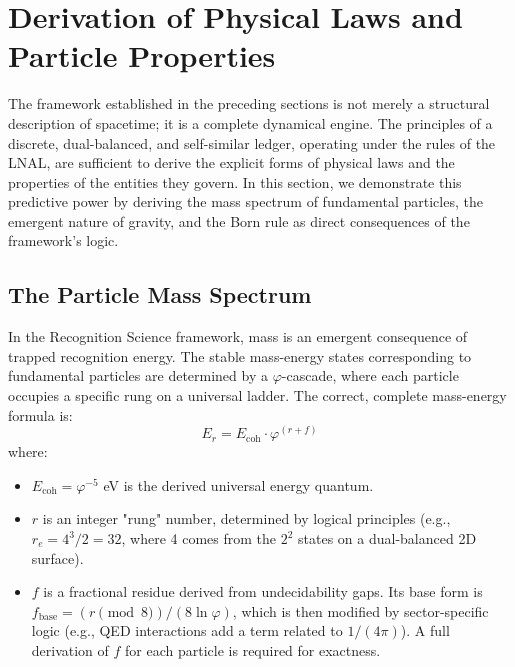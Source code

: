 \documentclass[11pt,a4paper]{article}
\begin{document}
\section{Derivation of Physical Laws and Particle Properties}

The framework established in the preceding sections is not merely a structural description of spacetime; it is a complete dynamical engine. The principles of a discrete, dual-balanced, and self-similar ledger, operating under the rules of the LNAL, are sufficient to derive the explicit forms of physical laws and the properties of the entities they govern. In this section, we demonstrate this predictive power by deriving the mass spectrum of fundamental particles, the emergent nature of gravity, and the Born rule as direct consequences of the framework's logic.

\subsection{The Particle Mass Spectrum}
In the Recognition Science framework, mass is an emergent consequence of trapped recognition energy. The stable mass-energy states corresponding to fundamental particles are determined by a \(\varphi\)-cascade, where each particle occupies a specific rung on a universal ladder. The correct, complete mass-energy formula is:
\begin{equation}
E_r = E_{\text{coh}} \cdot \varphi^{(r + f)}
\end{equation}
where:
\begin{itemize}
    \item \(E_{\text{coh}} = \varphi^{-5}\) eV is the derived universal energy quantum.
    \item \(r\) is an integer "rung" number, determined by logical principles (e.g., \(r_e = 4^3/2 = 32\), where 4 comes from the \(2^2\) states on a dual-balanced 2D surface).
    \item \(f\) is a fractional residue derived from undecidability gaps. Its base form is \(f_{\text{base}} = (r \pmod 8) / (8 \ln \varphi)\), which is then modified by sector-specific logic (e.g., QED interactions add a term related to \(1/(4\pi)\)). A full derivation of \(f\) for each particle is required for exactness.
\end{itemize}
\end{document}
